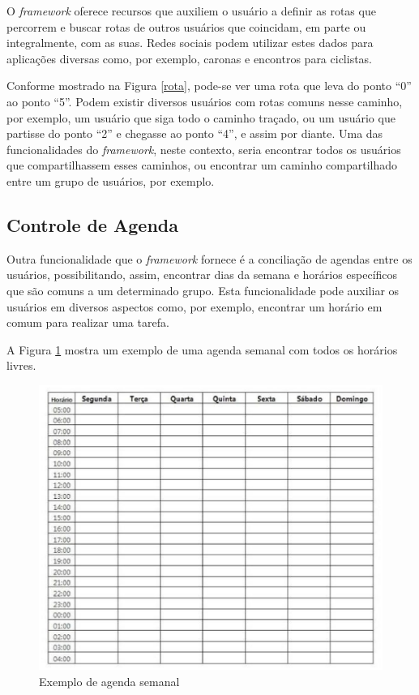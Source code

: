 O \textit{framework} oferece recursos que auxiliem o usuário a definir as rotas que percorrem e buscar rotas de outros usuários que coincidam, em parte ou integralmente, com as suas. Redes sociais podem utilizar estes dados para aplicações diversas como, por exemplo, caronas e encontros para ciclistas.

Conforme mostrado na Figura \ref{rota}, pode-se ver uma rota que leva do ponto ``0'' ao ponto ``5''. Podem existir diversos usuários com rotas comuns nesse caminho, por exemplo, um usuário que siga todo o caminho traçado, ou um usuário que partisse do ponto ``2'' e chegasse ao ponto ``4'', e assim por diante. Uma das funcionalidades do \textit{framework}, neste contexto, seria encontrar todos os usuários que compartilhassem esses caminhos, ou encontrar um caminho compartilhado entre um grupo de usuários, por exemplo.

\subsection{Controle de Agenda}

Outra funcionalidade que o \textit{framework} fornece é a conciliação de agendas entre os usuários, possibilitando, assim, encontrar dias da semana e horários específicos que são comuns a um determinado grupo. Esta funcionalidade pode auxiliar os usuários em diversos aspectos como, por exemplo, encontrar um horário em comum para realizar uma tarefa.

A Figura \ref{agenda semanal} mostra um exemplo de uma agenda semanal com todos os horários livres.

\begin{figure}[!h]
	\centering
	\includegraphics[scale=0.55]{figuras/proposta/agenda_semanal.eps}
	\caption[Exemplo de agenda semanal]{Exemplo de agenda semanal\footnotemark}
	\label{agenda semanal}
\end{figure}

